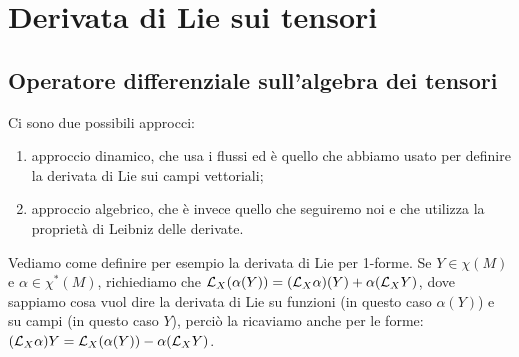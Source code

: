 \chapter{Derivata di Lie sui tensori}

\section{Operatore differenziale sull'algebra dei tensori}

Ci sono due possibili approcci:
\begin{enumerate}
	\item approccio dinamico, che usa i flussi ed è quello che abbiamo usato per definire la derivata di Lie sui campi vettoriali;
	\item approccio algebrico, che è invece quello che seguiremo noi e che utilizza la proprietà di Leibniz delle derivate.
\end{enumerate}

\begin{example}
	Vediamo come definire per esempio la derivata di Lie per 1-forme.
	Se $Y\in\chi(M)$ e $\alpha\in\chi^*(M)$, richiediamo che $\mathcal L_X(\alpha ( Y)) = (\mathcal L_X \alpha)(Y) + \alpha(\mathcal L_X Y)$, dove sappiamo cosa vuol dire la derivata di Lie su funzioni (in questo caso $\alpha(Y)$) e su campi (in questo caso $Y$), perciò la ricaviamo anche per le forme: $(\mathcal L_X\alpha)Y = \mathcal L_X(\alpha(Y)) - \alpha(\mathcal L_XY)$.
\end{example}

